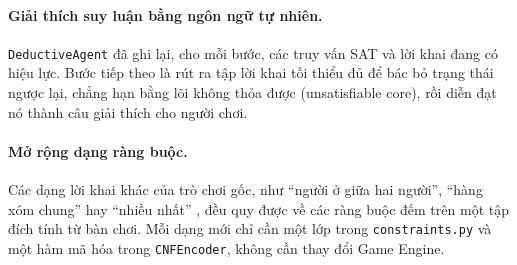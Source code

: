 \paragraph{Giải thích suy luận bằng ngôn ngữ tự nhiên.}
\texttt{DeductiveAgent} đã ghi lại, cho mỗi bước, các truy vấn SAT và lời khai
đang có hiệu lực. Bước tiếp theo là rút ra tập lời khai tối thiểu đủ để bác bỏ
trạng thái ngược lại, chẳng hạn bằng lõi không thỏa được (unsatisfiable core),
rồi diễn đạt nó thành câu giải thích cho người chơi.

\paragraph{Mở rộng dạng ràng buộc.}
Các dạng lời khai khác của trò chơi gốc, như ``người ở giữa hai người'', ``hàng
xóm chung'' hay ``nhiều nhất'' \cite{griductive_rules}, đều quy được về các
ràng buộc đếm trên một tập đích tính từ bàn chơi. Mỗi dạng mới chỉ cần một lớp
trong \texttt{constraints.py} và một hàm mã hóa trong \texttt{CNFEncoder}, không
cần thay đổi Game Engine.
